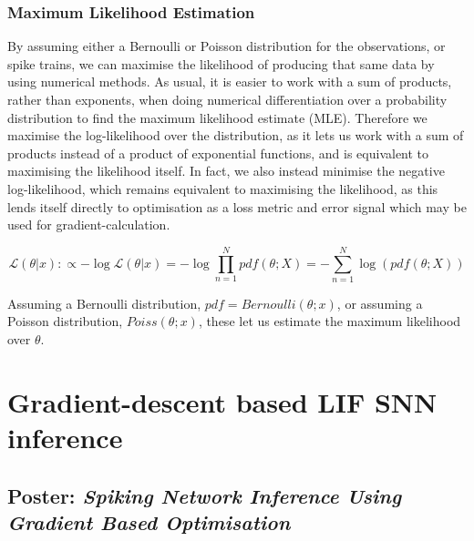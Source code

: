 \documentclass[mphil,deptreport,ianc]{infthesis} %
\begin{document}


\subsection{Maximum Likelihood Estimation}

By assuming either a Bernoulli or Poisson distribution for the observations, or spike trains, we can maximise the likelihood of producing that same data by using numerical methods.
As usual, it is easier to work with a sum of products, rather than exponents, when doing numerical differentiation over a probability distribution to find the maximum likelihood estimate (MLE).
Therefore we maximise the log-likelihood over the distribution, as it lets us work with a sum of products instead of a product of exponential functions, and is equivalent to maximising the likelihood itself.
In fact, we also instead minimise the negative log-likelihood, which remains equivalent to maximising the likelihood, as this lends itself directly to optimisation as a loss metric and error signal which may be used for gradient-calculation.

\begin{equation}
    \mathcal{L}(\theta | x) :\propto - \log \mathcal{L}(\theta | x) = - \log \prod_{n=1}^N pdf(\theta; X) = - \sum_{n=1}^N \log (pdf(\theta; X))
\end{equation}

Assuming a Bernoulli distribution, $pdf=Bernoulli(\theta; x)$, or assuming a Poisson distribution, $Poiss(\theta; x)$, these let us estimate the maximum likelihood over $\theta$.


\chapter{Gradient-descent based LIF SNN inference}\label{chpt:LIF}

\section{Poster: \textit{Spiking Network Inference Using Gradient Based Optimisation}}
\end{document}
